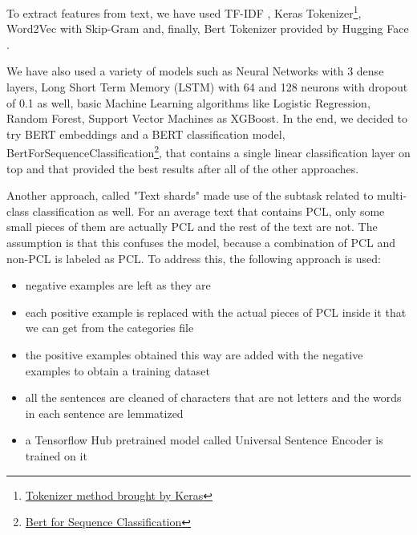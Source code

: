 \documentclass[11pt]{article}
\begin{document}
\begin{enumerate}
	      To extract features from text, we have used TF-IDF \cite{ref1}, Keras Tokenizer\footnote{\href{https://www.tensorflow.org/api_docs/python/tf/keras/preprocessing/text/Tokenizer}{Tokenizer method brought by Keras}}, Word2Vec with Skip-Gram \cite{mikolov2013word2vec} and, finally, Bert Tokenizer provided by Hugging Face \cite{huggingface}.

	      We have also used a variety of models such as Neural Networks with 3 dense layers, Long Short
	      Term Memory (LSTM) \cite{hichreichter} with 64 and 128 neurons with dropout of 0.1 as well, basic
	      Machine Learning algorithms like Logistic Regression, Random Forest, Support
	      Vector Machines as XGBoost. In the end, we decided to try BERT embeddings
	      and a BERT classification model, BertForSequenceClassification\footnote{\href{https://huggingface.co/docs/transformers/model_doc/bert#transformers.BertForSequenceClassification}{Bert for Sequence Classification}}, that
	      contains a single linear classification layer on top and that provided the
	      best results after all of the other approaches.

	      Another approach, called "Text shards" made use of the subtask related to
	      multi-class classification as well. For an average text that contains PCL,
	      only some small pieces of them are actually PCL and the rest of the text are
	      not. The assumption is that this confuses the model, because a combination
	      of PCL and non-PCL is labeled as PCL. To address this, the following
	      approach is used:

	      \begin{itemize}
		      \item negative examples are left as they are

		      \item each positive example is replaced with the actual pieces of PCL inside
		            it that we can get from the categories file

		      \item the positive examples obtained this way are added with the negative
		            examples to obtain a training dataset

		      \item all the sentences are cleaned of characters that are not letters and
		            the words in each sentence are lemmatized

		      \item a Tensorflow Hub pretrained model called Universal Sentence Encoder \cite{USE} is
		            trained on it


\end{itemize}
\end{enumerate}
\end{document}
